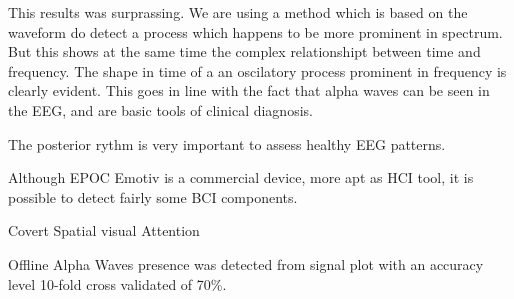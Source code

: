 This results was surprassing.  We are using a method which is based on the waveform do detect a process which happens to be more prominent in spectrum.  But this shows at the same time the complex relationshipt between time and frequency.  The shape in time of a an oscilatory process prominent in frequency is clearly evident.  This goes in line with the fact that alpha waves can be seen in the EEG, and are basic tools of clinical diagnosis.

The posterior rythm is very important to assess healthy EEG patterns.


Although EPOC Emotiv is a commercial device, more apt as HCI tool, it is possible to detect fairly some BCI components.

Covert Spatial visual Attention


Offline Alpha Waves presence was detected from signal plot with an accuracy level 10-fold cross validated of 70\%.